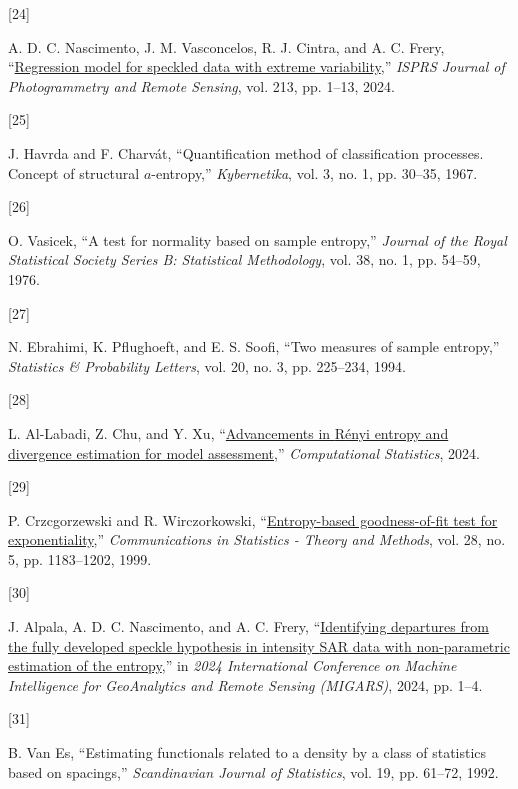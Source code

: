 \documentclass[
  lettersize  journal,
]{IEEEtran}%
\newlength{\cslhangindent}
\newlength{\csllabelwidth}
\newenvironment{CSLReferences}[2] %
 {\begin{list}{}{%
  \setlength{\itemindent}{0pt}
  \setlength{\leftmargin}{0pt}
  \setlength{\parsep}{0pt}
  \ifodd #1
   \setlength{\leftmargin}{\cslhangindent}
   \setlength{\itemindent}{-1\cslhangindent}
  \fi
  \setlength{\itemsep}{#2\baselineskip}}}
 {\end{list}}
\newcommand{\CSLLeftMargin}[1]{\parbox[t]{\csllabelwidth}{\strut#1\strut}}
\newcommand{\CSLRightInline}[1]{\parbox[t]{\linewidth - \csllabelwidth}{\strut#1\strut}}
\begin{document}
\begin{CSLReferences}{0}{0}
\CSLLeftMargin{{[}24{]} }%
\CSLRightInline{A. D. C. Nascimento, J. M. Vasconcelos, R. J. Cintra,
and A. C. Frery,
{``\href{https://doi.org/10.1016/j.isprsjprs.2024.05.009}{Regression
model for speckled data with extreme variability},''} \emph{ISPRS
Journal of Photogrammetry and Remote Sensing}, vol. 213, pp. 1--13,
2024. }

\CSLLeftMargin{{[}25{]} }%
\CSLRightInline{J. Havrda and F. Charvát, {``Quantification method of
classification processes. Concept of structural \(a\)-entropy,''}
\emph{Kybernetika}, vol. 3, no. 1, pp. 30--35, 1967. }

\CSLLeftMargin{{[}26{]} }%
\CSLRightInline{O. Vasicek, {``A test for normality based on sample
entropy,''} \emph{Journal of the Royal Statistical Society Series B:
Statistical Methodology}, vol. 38, no. 1, pp. 54--59, 1976. }

\CSLLeftMargin{{[}27{]} }%
\CSLRightInline{N. Ebrahimi, K. Pflughoeft, and E. S. Soofi, {``Two
measures of sample entropy,''} \emph{Statistics \& Probability Letters},
vol. 20, no. 3, pp. 225--234, 1994. }

\CSLLeftMargin{{[}28{]} }%
\CSLRightInline{L. Al-Labadi, Z. Chu, and Y. Xu,
{``\href{https://doi.org/10.1007/s00180-024-01507-z}{Advancements in
{R}ényi entropy and divergence estimation for model assessment},''}
\emph{Computational Statistics}, 2024. }

\CSLLeftMargin{{[}29{]} }%
\CSLRightInline{P. Crzcgorzewski and R. Wirczorkowski,
{``\href{https://doi.org/10.1080/03610929908832351}{Entropy-based
goodness-of-fit test for exponentiality},''} \emph{Communications in
Statistics - Theory and Methods}, vol. 28, no. 5, pp. 1183--1202, 1999.
}

\CSLLeftMargin{{[}30{]} }%
\CSLRightInline{J. Alpala, A. D. C. Nascimento, and A. C. Frery,
{``\href{https://doi.org/10.1109/migars61408.2024.10544448}{Identifying
departures from the fully developed speckle hypothesis in intensity
{SAR} data with non-parametric estimation of the entropy},''} in
\emph{2024 {I}nternational {C}onference on {M}achine {I}ntelligence for
{G}eo{A}nalytics and {R}emote {S}ensing ({MIGARS})}, 2024, pp. 1--4. }

\CSLLeftMargin{{[}31{]} }%
\CSLRightInline{B. Van Es, {``Estimating functionals related to a
density by a class of statistics based on spacings,''}
\emph{Scandinavian Journal of Statistics}, vol. 19, pp. 61--72, 1992. }


\end{CSLReferences}
\end{document}
